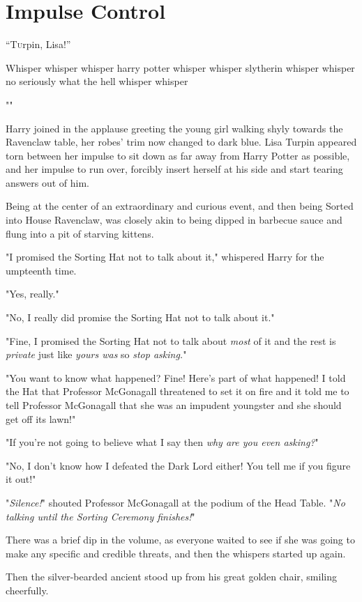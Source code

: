 \chapter{Impulse Control}

\lettrine{“T}urpin, Lisa!''

Whisper whisper whisper harry potter whisper whisper slytherin whisper whisper
no seriously what the hell whisper whisper

""

Harry joined in the applause greeting the young girl walking shyly towards the
Ravenclaw table, her robes' trim now changed to dark blue. Lisa Turpin appeared
torn between her impulse to sit down as far away from Harry Potter as possible,
and her impulse to run over, forcibly insert herself at his side and start
tearing answers out of him.

Being at the center of an extraordinary and curious event, and then being
Sorted into House Ravenclaw, was closely akin to being dipped in barbecue sauce
and flung into a pit of starving kittens.

"I promised the Sorting Hat not to talk about it," whispered Harry for the
umpteenth time.

"Yes, really."

"No, I really did promise the Sorting Hat not to talk about it."

"Fine, I promised the Sorting Hat not to talk about \emph{most} of it and the
rest is \emph{private} just like \emph{yours was} so \emph{stop asking.}"

"You want to know what happened? Fine! Here's part of what happened! I told the
Hat that Professor McGonagall threatened to set it on fire and it told me to
tell Professor McGonagall that she was an impudent youngster and she should get
off its lawn!"

"If you're not going to believe what I say then \emph{why are you even asking?}"

"No, I don't know how I defeated the Dark Lord either! You tell me if you
figure it out!"

"\emph{Silence!}" shouted Professor McGonagall at the podium of the Head Table.
"\emph{No talking until the Sorting Ceremony finishes!}"

There was a brief dip in the volume, as everyone waited to see if she was going
to make any specific and credible threats, and then the whispers started up
again.

Then the silver-bearded ancient stood up from his great golden chair, smiling
cheerfully.

